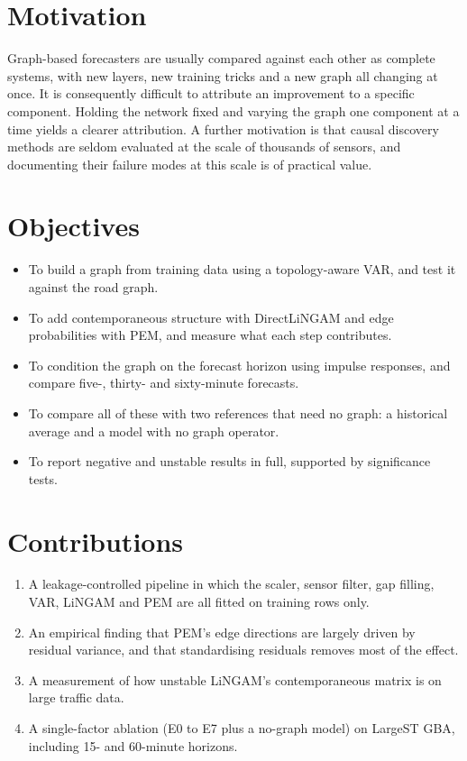 \documentclass[MTech]{ugthesis}
\begin{document}
\section{Motivation}
Graph-based forecasters are usually compared against each other as complete systems, with new layers, new training tricks and a new graph all changing at once. It is consequently difficult to attribute an improvement to a specific component. Holding the network fixed and varying the graph one component at a time yields a clearer attribution. A further motivation is that causal discovery methods are seldom evaluated at the scale of thousands of sensors, and documenting their failure modes at this scale is of practical value.

\section{Objectives}
\begin{itemize}
\item To build a graph from training data using a topology-aware VAR, and test it against the road graph.
\item To add contemporaneous structure with DirectLiNGAM and edge probabilities with PEM, and measure what each step contributes.
\item To condition the graph on the forecast horizon using impulse responses, and compare five-, thirty- and sixty-minute forecasts.
\item To compare all of these with two references that need no graph: a historical average and a model with no graph operator.
\item To report negative and unstable results in full, supported by significance tests.
\end{itemize}

\section{Contributions}
\begin{enumerate}
\item A leakage-controlled pipeline in which the scaler, sensor filter, gap filling, VAR, LiNGAM and PEM are all fitted on training rows only.
\item An empirical finding that PEM's edge directions are largely driven by residual variance, and that standardising residuals removes most of the effect.
\item A measurement of how unstable LiNGAM's contemporaneous matrix is on large traffic data.
\item A single-factor ablation (E0 to E7 plus a no-graph model) on LargeST GBA, including 15- and 60-minute horizons.
\end{enumerate}
\end{document}
